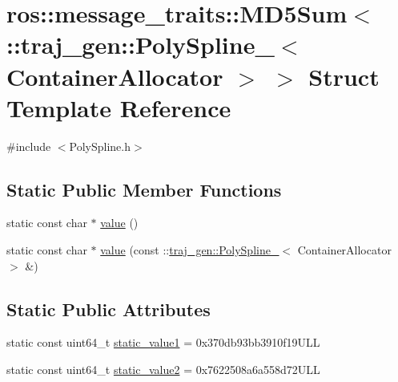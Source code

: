 \hypertarget{structros_1_1message__traits_1_1_m_d5_sum_3_01_1_1traj__gen_1_1_poly_spline___3_01_container_allocator_01_4_01_4}{}\section{ros\+:\+:message\+\_\+traits\+:\+:M\+D5\+Sum$<$ \+:\+:traj\+\_\+gen\+:\+:Poly\+Spline\+\_\+$<$ Container\+Allocator $>$ $>$ Struct Template Reference}
\label{structros_1_1message__traits_1_1_m_d5_sum_3_01_1_1traj__gen_1_1_poly_spline___3_01_container_allocator_01_4_01_4}


{\ttfamily \#include $<$Poly\+Spline.\+h$>$}

\subsection*{Static Public Member Functions}
\begin{DoxyCompactItemize}
\item 
static const char $\ast$ \hyperlink{structros_1_1message__traits_1_1_m_d5_sum_3_01_1_1traj__gen_1_1_poly_spline___3_01_container_allocator_01_4_01_4_a3c949ebae748b17d078680e619b8a31d}{value} ()
\item 
static const char $\ast$ \hyperlink{structros_1_1message__traits_1_1_m_d5_sum_3_01_1_1traj__gen_1_1_poly_spline___3_01_container_allocator_01_4_01_4_ad5fb23c8ee28b87aa118f1f071fdc3b5}{value} (const \+::\hyperlink{structtraj__gen_1_1_poly_spline__}{traj\+\_\+gen\+::\+Poly\+Spline\+\_\+}$<$ Container\+Allocator $>$ \&)
\end{DoxyCompactItemize}
\subsection*{Static Public Attributes}
\begin{DoxyCompactItemize}
\item 
static const uint64\+\_\+t \hyperlink{structros_1_1message__traits_1_1_m_d5_sum_3_01_1_1traj__gen_1_1_poly_spline___3_01_container_allocator_01_4_01_4_a9b04376c25deef7728e828846226eb45}{static\+\_\+value1} = 0x370db93bb3910f19\+U\+LL
\item 
static const uint64\+\_\+t \hyperlink{structros_1_1message__traits_1_1_m_d5_sum_3_01_1_1traj__gen_1_1_poly_spline___3_01_container_allocator_01_4_01_4_a21950104357133decca1c2a10edddc78}{static\+\_\+value2} = 0x7622508a6a558d72\+U\+LL
\end{DoxyCompactItemize}



